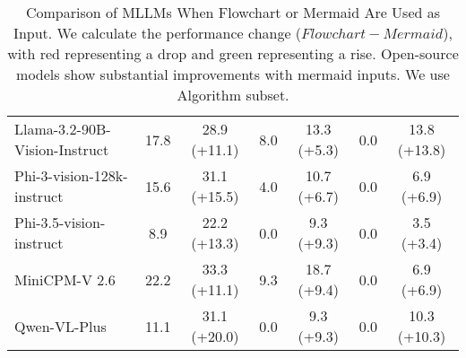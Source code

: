 \begin{table*}[t]
{\begin{tabular}{lcccccc}
Llama-3.2-90B-Vision-Instruct    & 17.8      & 28.9 {\color[HTML]{009901}(+11.1)}                       & 8.0             & 13.3 {\color[HTML]{009901}(+5.3)}       & 0.0            & 13.8 {\color[HTML]{009901}(+13.8)}     \\
Phi-3-vision-128k-instruct       & 15.6      & 31.1 {\color[HTML]{009901}(+15.5)}                       & 4.0             & 10.7 {\color[HTML]{009901}(+6.7)}       & 0.0            & 6.9 {\color[HTML]{009901}(+6.9)}       \\
Phi-3.5-vision-instruct          & 8.9       & 22.2 {\color[HTML]{009901}(+13.3)}                       & 0.0             & 9.3 {\color[HTML]{009901}(+9.3)}        & 0.0            & 3.5 {\color[HTML]{009901}(+3.4)}       \\
MiniCPM-V 2.6                    & 22.2      & 33.3 {\color[HTML]{009901}(+11.1)}                       & 9.3             & 18.7 {\color[HTML]{009901}(+9.4)}       & 0.0            & 6.9 {\color[HTML]{009901}(+6.9)}       \\
Qwen-VL-Plus                     & 11.1      & 31.1 {\color[HTML]{009901}(+20.0)}                       & 0.0             & 9.3 {\color[HTML]{009901}(+9.3)}        & 0.0            & 10.3 {\color[HTML]{009901}(+10.3)}     \\ \hline
\end{tabular}
}
\caption{Comparison of MLLMs When Flowchart or Mermaid Are Used as Input. We calculate the performance change ($Flowchart-Mermaid$), with {\color[HTML]{FE0000}red} representing a drop and {\color[HTML]{009901}green} representing a rise. Open-source models show substantial improvements with mermaid inputs. We use Algorithm subset.}
\label{tab: mermaid}
\end{table*}